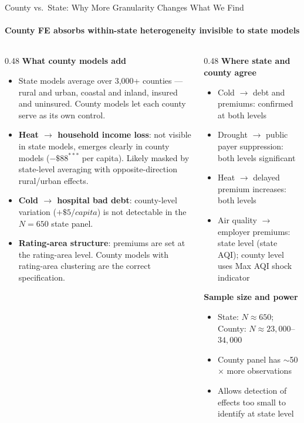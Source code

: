 \documentclass[aspectratio=169,11pt]{beamer}
\newcommand{\emphcolor}[1]{{\color{WarmOrange}\textbf{#1}}}
\newcommand{\tealtext}[1]{{\color{Teal}#1}}
\begin{document}
\begin{frame}[shrink=18]{County vs.\ State: Why More Granularity Changes What We Find}
  \framesubtitle{County FE absorbs within-state heterogeneity invisible to state models}
  \begin{columns}[T]
    \begin{column}{0.48\textwidth}
      \textbf{\tealtext{What county models add}}\\[0.2em]
      \footnotesize
      \begin{itemize}\itemsep0.16em
        \item State models average over 3,000+ counties --- rural and urban, coastal and inland, insured and uninsured. County models let each county serve as its own control.
        \item \emphcolor{Heat $\to$ household income loss}: not visible in state models, emerges clearly in county models ($-\$88^{***}$ per capita). Likely masked by state-level averaging with opposite-direction rural/urban effects.
        \item \emphcolor{Cold $\to$ hospital bad debt}: county-level variation ($+\$5/capita$) is not detectable in the $N=650$ state panel.
        \item \emphcolor{Rating-area structure}: premiums are set at the rating-area level. County models with rating-area clustering are the correct specification.
      \end{itemize}
    \end{column}
    \begin{column}{0.48\textwidth}
      \textbf{\tealtext{Where state and county agree}}\\[0.2em]
      \footnotesize
      \begin{itemize}\itemsep0.16em
        \item Cold $\to$ debt and premiums: confirmed at both levels
        \item Drought $\to$ public payer suppression: both levels significant
        \item Heat $\to$ delayed premium increases: both levels
        \item Air quality $\to$ employer premiums: state level (state AQI); county level uses Max AQI shock indicator
      \end{itemize}
      \vspace{0.3em}
      \textbf{\tealtext{Sample size and power}}\\[0.2em]
      \begin{itemize}\itemsep0.12em
        \item State: $N \approx 650$; County: $N \approx 23{,}000$--$34{,}000$
        \item County panel has $\sim$50$\times$ more observations
        \item Allows detection of effects too small to identify at state level
      \end{itemize}
    \end{column}
  \end{columns}
\end{frame}
\end{document}
